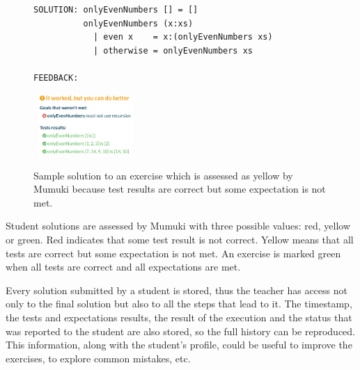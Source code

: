 \begin{figure}

\begin{verbatim}
SOLUTION: onlyEvenNumbers [] = []
          onlyEvenNumbers (x:xs)
            | even x    = x:(onlyEvenNumbers xs)
            | otherwise = onlyEvenNumbers xs

FEEDBACK:
\end{verbatim}
\vspace*{-0.7cm}
\hspace*{1.5cm}\mbox{
    \includegraphics[width=0.32\textwidth]{screenshots/atheneum-warning-direct-recursion-used.png}
    }
    
\caption{Sample solution to an exercise which is assessed as yellow by Mumuki because test results are correct but some expectation is not met.\label{fig:recursion}}

\end{figure}    

Student solutions are assessed by Mumuki with three possible values: red, yellow or green. Red indicates that some test result is not correct. Yellow means that all tests are correct but some expectation is not met. An exercise is marked green when all tests are correct and all expectations are met. 

Every solution submitted by a student is stored, thus the teacher has access not only to the final solution but also to all the steps that lead to it. The timestamp, the tests and expectations results, the result of the execution and the status that was reported to the student are also stored, so the full history can be reproduced. This information, along with the student's profile, could be useful to improve the exercises, to explore common mistakes, etc.

